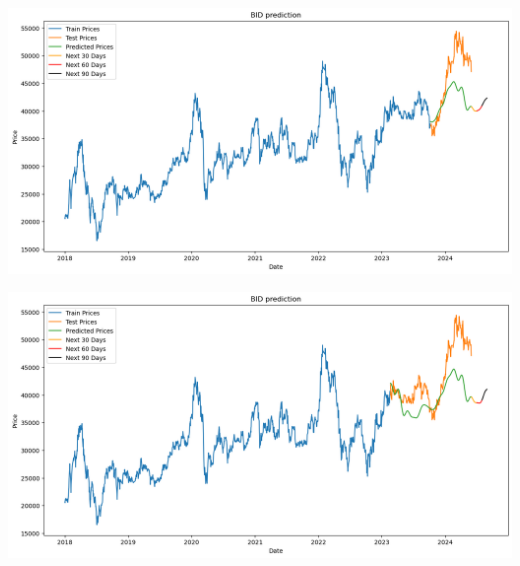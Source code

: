 \documentclass[conference]{IEEEtran}
\begin{document}
\begin{minipage}{0.21\textwidth}
    \centering
    \includegraphics[width=\linewidth]{images/LR CalendarFourier, DeterministicProcess/LRCD_BIDV_91.png}
    \label{fig:image1}
\end{minipage}
\hfill
\begin{minipage}{0.21\textwidth}
    \centering
    \includegraphics[width=\linewidth]{images/LR CalendarFourier, DeterministicProcess/LRCD_BIDV_82.png}
    \label{fig:image2}
\end{minipage}
\end{document}

